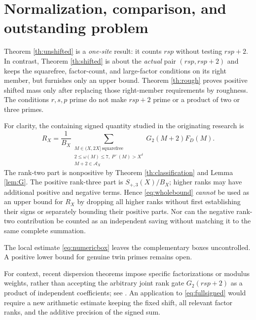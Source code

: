 \documentclass[11pt]{article}
\newcommand{\aset}{\mathcal A}
\newcommand{\phimin}{P^-}
\begin{document}
\section{Normalization, comparison, and outstanding problem}

Theorem \ref{th:unshifted} is a \emph{one-site} result: it
counts $rsp$ without testing $rsp+2$.  In contrast,
Theorem \ref{th:shifted} is about the \emph{actual} pair
$(rsp,rsp+2)$ and keeps the squarefree, factor-count, and large-factor
conditions on its right member, but furnishes only an upper bound.
Theorem \ref{th:rough} proves positive shifted mass only after replacing
those right-member requirements by roughness.
The conditions $r,s,p$ prime do not make $rsp+2$ prime or a
product of two or three primes.

For clarity, the containing signed quantity studied in the originating
research is
\begin{equation}\label{eq:fullsigned}
 R_X=\frac1{B_X}\sum_{\substack{M\in(X,2X]\ \mathrm{squarefree}\\
                   2\le\omega(M)\le7,\ \phimin(M)>X^\delta\\
                   M+2\in\aset_X}}
               G_2(M+2)F_D(M).
\end{equation}
The rank-two part is nonpositive by Theorem \ref{th:classification}
and Lemma \ref{lem:G}.
The positive rank-three part is \(S_{+,3}(X)/B_X\); higher ranks may have
additional positive and negative terms.  Hence
\eqref{eq:wholebound} \emph{cannot} be used as an upper bound for
$R_X$ by dropping all higher ranks without first establishing their
signs or separately bounding their positive parts.  Nor can the
negative rank-two contribution be counted as an independent saving
without matching it to the same complete summation.

The local estimate \eqref{eq:numericbox} leaves the complementary
boxes uncontrolled. A positive lower bound for genuine twin primes
remains open.

For context, recent dispersion theorems impose specific
factorizations or modulus weights, rather than accepting the
arbitrary joint rank gate $G_2(rsp+2)$ as a product of independent
coefficients; see \cite{Maynard, PascadiSmooth, PascadiLevels}.
An application to \eqref{eq:fullsigned} would require a new
arithmetic estimate keeping the fixed shift, all relevant factor
ranks, and the additive precision of the signed sum.
\end{document}
